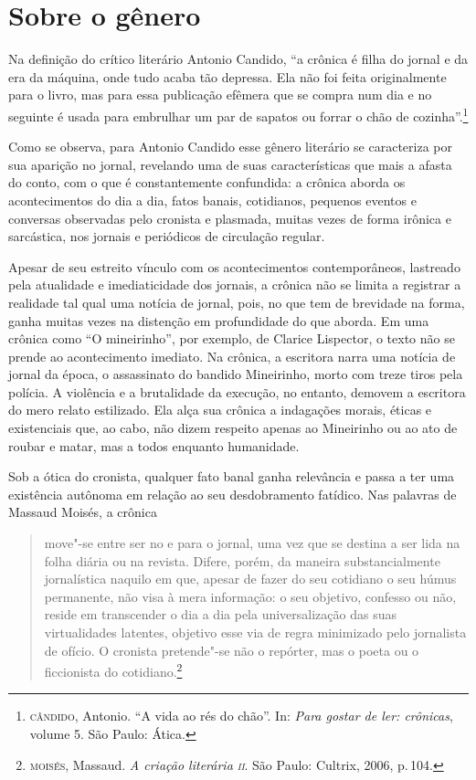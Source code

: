 \section{Sobre o gênero}

Na definição do crítico literário Antonio Candido, ``a crônica é filha do jornal e da era da máquina, onde tudo acaba tão depressa. Ela não foi feita originalmente para o livro, mas para essa publicação efêmera que se compra num dia e no seguinte é usada para embrulhar um par de sapatos ou forrar o chão de cozinha''.\footnote{\textsc{cândido}, Antonio. ``A vida ao rés do chão''. In: \textit{Para gostar de ler: crônicas}, volume 5. São Paulo: Ática.}

Como se observa, para Antonio Candido esse gênero literário se caracteriza por sua aparição no jornal, revelando uma de suas características que mais a afasta do conto, com o que é constantemente confundida: a crônica aborda os acontecimentos do dia a dia, fatos banais, cotidianos, pequenos eventos e conversas observadas pelo cronista e plasmada, muitas vezes de forma irônica e sarcástica, nos jornais e periódicos de circulação regular.

Apesar de seu estreito vínculo com os acontecimentos contemporâneos, lastreado pela atualidade e imediaticidade dos jornais, a crônica não se limita a registrar a realidade tal qual uma notícia de jornal, pois, no que tem de brevidade na forma, ganha muitas vezes na distenção em profundidade do que aborda. Em uma crônica como ``O mineirinho'', por exemplo, de Clarice Lispector, o texto não se prende ao acontecimento imediato. Na crônica, a escritora narra uma notícia de jornal da época, o assassinato do bandido Mineirinho, morto com treze tiros pela polícia.
A violência e a brutalidade da execução, no entanto, demovem a escritora do mero relato estilizado. Ela alça sua crônica a indagações morais, éticas e existenciais que, ao cabo, não dizem respeito apenas ao Mineirinho ou ao ato de roubar e matar, mas a todos enquanto humanidade.

Sob a ótica do cronista, qualquer fato banal ganha relevância e passa a ter uma existência autônoma em relação ao seu desdobramento fatídico.
Nas palavras de Massaud Moisés, a crônica

\begin{quote}
move"-se entre ser no e para o jornal,
uma vez que se destina a ser lida na folha diária ou na revista. Difere, porém,
da maneira substancialmente jornalística naquilo em que, apesar de fazer do
seu cotidiano o seu húmus permanente, não visa à mera informação: o seu
objetivo, confesso ou não, reside em transcender o dia a dia pela universalização das suas virtualidades latentes, objetivo esse via de regra minimizado
pelo jornalista de ofício. O cronista pretende"-se não o repórter, mas o poeta ou
o ficcionista do cotidiano.\footnote{\textsc{moisés}, Massaud. \textit{A criação literária \textsc{ii}}. São Paulo: Cultrix, 2006, p.\,104.}
\end{quote}

